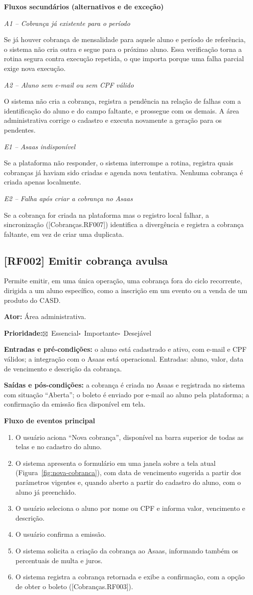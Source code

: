 \documentclass[11pt,a4paper,oneside]{report}
\newcommand{\req}[2]{%
  \subsection*{[#1] #2}%
  \addcontentsline{toc}{subsection}{[#1] #2}}
\newcommand{\marcado}{$\boxtimes$}
\newcommand{\vazio}{$\square$}
\newcommand{\prioE}{\par\textbf{Prioridade:}\quad\marcado~Essencial\quad\vazio~Importante\quad\vazio~Desejável\par}
\newcommand{\ator}[1]{\par\textbf{Ator:} #1\par}
\newcommand{\entradas}{\textbf{Entradas e pré-condições:} }
\newcommand{\saidas}{\par\textbf{Saídas e pós-condições:} }
\newcommand{\fluxoprincipal}{\par\textbf{Fluxo de eventos principal}\par}
\newcommand{\fluxossecundarios}{\par\textbf{Fluxos secundários (alternativos e de exceção)}\par}
\newcommand{\fluxo}[2]{\par\smallskip\textit{#1 -- #2}\par}
\begin{document}
\fluxossecundarios

\fluxo{A1}{Cobrança já existente para o período}
Se já houver cobrança de mensalidade para aquele aluno e período de referência, o sistema não cria
outra e segue para o próximo aluno. Essa verificação torna a rotina segura contra execução
repetida, o que importa porque uma falha parcial exige nova execução.

\fluxo{A2}{Aluno sem e-mail ou sem CPF válido}
O sistema não cria a cobrança, registra a pendência na relação de falhas com a identificação do
aluno e do campo faltante, e prossegue com os demais. A área administrativa corrige o cadastro e
executa novamente a geração para os pendentes.

\fluxo{E1}{Asaas indisponível}
Se a plataforma não responder, o sistema interrompe a rotina, registra quais cobranças já haviam
sido criadas e agenda nova tentativa. Nenhuma cobrança é criada apenas localmente.

\fluxo{E2}{Falha após criar a cobrança no Asaas}
Se a cobrança for criada na plataforma mas o registro local falhar, a sincronização
([Cobranças.RF007]) identifica a divergência e registra a cobrança faltante, em vez de criar uma
duplicata.

\req{RF002}{Emitir cobrança avulsa}

Permite emitir, em uma única operação, uma cobrança fora do ciclo recorrente, dirigida a um aluno
específico, como a inscrição em um evento ou a venda de um produto do CASD.

\ator{Área administrativa.}
\prioE

\entradas o aluno está cadastrado e ativo, com e-mail e CPF válidos; a integração com o Asaas está
operacional. Entradas: aluno, valor, data de vencimento e descrição da cobrança.

\saidas a cobrança é criada no Asaas e registrada no sistema com situação ``Aberta''; o boleto é
enviado por e-mail ao aluno pela plataforma; a confirmação da emissão fica disponível em tela.

\fluxoprincipal
\begin{enumerate}
  \item O usuário aciona ``Nova cobrança'', disponível na barra superior de todas as telas e no
        cadastro do aluno.
  \item O sistema apresenta o formulário em uma janela sobre a tela atual
        (Figura~\ref{fig:nova-cobranca}), com data de vencimento sugerida a partir dos parâmetros
        vigentes e, quando aberto a partir do cadastro do aluno, com o aluno já preenchido.
  \item O usuário seleciona o aluno por nome ou CPF e informa valor, vencimento e descrição.
  \item O usuário confirma a emissão.
  \item O sistema solicita a criação da cobrança ao Asaas, informando também os percentuais de
        multa e juros.
  \item O sistema registra a cobrança retornada e exibe a confirmação, com a opção de obter o
        boleto ([Cobranças.RF003]).
\end{enumerate}
\end{document}
